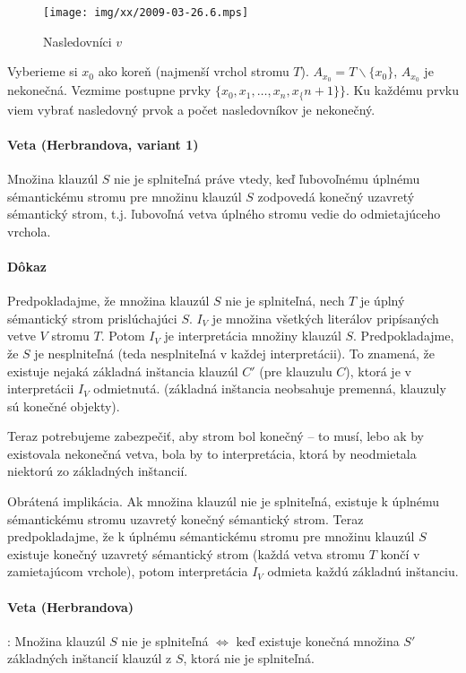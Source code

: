\begin{figure}[h]
	\centering\texttt{[image: img/xx/2009-03-26.6.mps]}
	\caption{Nasledovníci $v$}
	\label{0326_successors}
\end{figure}

\par Vyberieme si $x_0$ ako koreň (najmenší vrchol stromu $T$). $A_{x_0} =
T \backslash \{x_0\}$, $A_{x_0}$ je nekonečná. Vezmime postupne prvky $\{x_0,
x_1, \ldots , x_n, x_\{n+1\}\}$. Ku každému prvku viem vybrať nasledovný prvok a
počet nasledovníkov je nekonečný. 

\paragraph{Veta (Herbrandova, variant 1)} Množina klauzúl $S$ nie je splniteľná
práve vtedy, keď ľubovoľnému úplnému sémantickému stromu pre množinu klauzúl
$S$ zodpovedá konečný uzavretý sémantický strom, t.j. ľubovoľná vetva úplného
stromu vedie do odmietajúceho vrchola.

\paragraph{Dôkaz} Predpokladajme, že množina klauzúl $S$ nie je splniteľná, nech
$T$ je úplný sémantický strom prislúchajúci $S$. $I_V$ je množina všetkých
literálov pripísaných vetve $V$ stromu $T$. Potom $I_V$ je interpretácia
množiny klauzúl $S$. Predpokladajme, že $S$ je nesplniteľná (teda nesplniteľná v
každej interpretácii). To znamená, že existuje nejaká základná inštancia klauzúl
$C'$ (pre klauzulu $C$), ktorá je v interpretácii $I_V$ odmietnutá. (základná
inštancia neobsahuje premenná, klauzuly sú konečné objekty). 
\par Teraz potrebujeme zabezpečiť, aby strom bol konečný -- to musí, lebo ak by
existovala nekonečná vetva, bola by to interpretácia, ktorá by neodmietala
niektorú zo základných inštancií.

\par Obrátená implikácia. Ak množina klauzúl nie je splniteľná, existuje k
úplnému sémantickému stromu uzavretý konečný sémantický strom. Teraz
predpokladajme, že k úplnému sémantickému stromu pre množinu klauzúl
$S$ existuje konečný uzavretý sémantický strom (každá vetva stromu $T$ končí v
zamietajúcom vrchole), potom interpretácia $I_V$ odmieta každú základnú
inštanciu.


\paragraph{Veta (Herbrandova)}: Množina klauzúl $S$ nie je splniteľná $\iff$ keď
existuje konečná množina $S'$ základných inštancií klauzúl z $S$, ktorá nie je
splniteľná. \fixme{}

